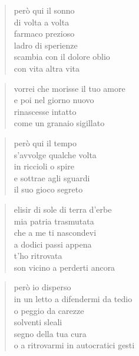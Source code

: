 	\begin{verse}
                però qui il sonno\\
                di volta a volta\\
                farmaco prezioso\\
                ladro di sperienze\\
                scambia con il dolore oblio\\
                con vita altra vita
	\end{verse}

	\begin{verse}
                vorrei che morisse il tuo amore\\
                e poi nel giorno nuovo\\
                rinascesse intatto\\
                come un granaio sigillato
	\end{verse}

	\begin{verse}
                però qui il tempo\\
                s’avvolge qualche volta\\
                in riccioli o spire\\
                e sottrae agli sguardi\\
                il suo gioco segreto
	\end{verse}

	\begin{verse}
                elisir di sole di terra d’erbe\\
                mia patria trasmutata\\
                che a me ti nascondevi\\
                a dodici passi appena\\
                t’ho ritrovata\\
                son vicino a perderti ancora
	\end{verse}

	\begin{verse}
                però io disperso\\
                in un letto a difendermi da tedio\\
                o peggio da carezze\\
                solventi sleali\\
                segno della tua cura\\
                o a ritrovarmi in autocratici gesti
	\end{verse}

